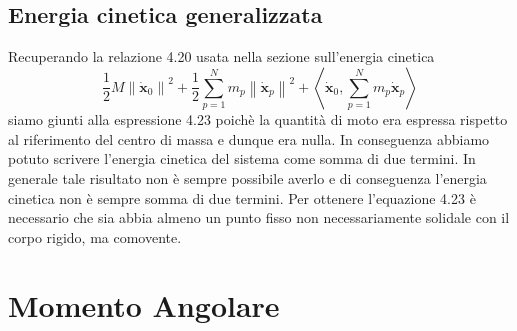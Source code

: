 \subsection{Energia cinetica generalizzata}
Recuperando la relazione 4.20 usata nella sezione sull'energia cinetica
\begin{equation*}
\frac{1}{2}M\left\|\bm{\dot{x}}_0\right\|^2+\frac{1}{2} \sum_{p=1}^N m_p\left\|\dot{\bm{x}}_p\right\|^2+\left\langle\bm{\dot{x}}_0, \sum_{p=1}^N m_p \dot{\bm{x}}_p\right\rangle
\end{equation*}
siamo giunti alla espressione 4.23 poich\`{e} la quantit\`{a} di moto era espressa rispetto al riferimento del centro di massa e dunque era nulla. In conseguenza abbiamo potuto scrivere l'energia cinetica del sistema come somma di due termini. In generale tale risultato non \`{e} sempre possibile averlo e di conseguenza l'energia cinetica non \`{e} sempre somma di due termini. Per ottenere l'equazione 4.23 \`{e} necessario che sia abbia almeno un punto fisso non necessariamente solidale con il corpo rigido, ma comovente.

\section{Momento Angolare}

